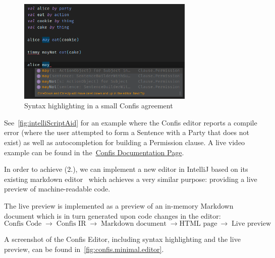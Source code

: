 \begin{figure}[h]
    \centering
    \includegraphics[width=0.75\textwidth]{figures/minimal.editor.highlighting.confis}
    \caption{Syntax highlighting in a small Confis agreement}
    \label{fig:intelliScriptAid}
\end{figure}

See~\autoref{fig:intelliScriptAid} for an example where the Confis editor reports a compile error (where the user attempted to form a Sentence with a Party that does not exist) as well as autocompletion for building a Permission clause.
A live video example can be found in the~\href{https://confis.dcotta.eu/0.1.1/IDE%20Support/IDEAPlugin/}{Confis Documentation Page}.

In order to achieve (2.), we can implement a new editor in IntelliJ based on its existing markdown editor~\cite{ideaMarkdownPreview} which achieves a very similar purpose: providing a live preview of machine-readable code.

The live preview is implemented as a preview of an in-memory Markdown document which is in turn generated upon code changes in the editor:
\begin{equation*}
    \text{Confis Code}\; \to\; \text{Confis IR}\; \to\; \text{Markdown document}\; \to \text{HTML page}\ \to\; \text{Live preview}
\end{equation*}

A screenshot of the Confis Editor, including syntax highlighting and the live preview, can be found in~\autoref{fig:confis.minimal.editor}.

